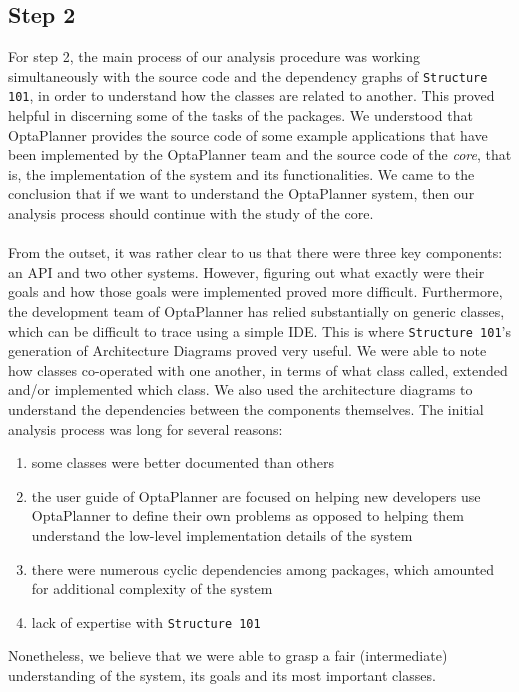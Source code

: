 \subsection{Step 2}
For step 2, the main process of our analysis procedure was working simultaneously with the source code and the dependency graphs of \verb!Structure 101!, in order to understand how the classes are related to another. This proved helpful in discerning some of the tasks of the packages. 
We understood that OptaPlanner provides the source code of some example applications that have been implemented by the OptaPlanner team and the source code of the \textit{core}, that is, the implementation of the system and its functionalities. We came to the conclusion that if we want to understand the OptaPlanner system, then our analysis process should continue with the study of the core.\\\\
From the outset, it was rather clear to us that there were three key components: an API and two other systems. However, figuring out what exactly were their goals and how those goals were implemented proved more difficult. Furthermore, the development team of OptaPlanner has relied substantially on generic classes, which can be difficult to trace using a simple IDE. This is where \verb!Structure 101!’s generation of Architecture Diagrams proved very useful. We were able to note how classes co-operated with one another, in terms of what class called, extended and/or implemented which class. We also used the architecture diagrams to understand the dependencies between the components themselves. The initial analysis process was long for several reasons:
\begin{enumerate}[label=(\roman*)]
    \item some classes were better documented than others
    \item the user guide of OptaPlanner are focused on helping new developers use OptaPlanner to define their own problems as opposed to helping them understand the low-level implementation details of the system
    \item there were numerous cyclic dependencies among packages, which amounted for additional complexity of the system
    \item lack of expertise with \verb!Structure 101!
\end{enumerate}
Nonetheless, we believe that we were able to grasp a fair (intermediate) understanding of the system, its goals and its most important classes.
